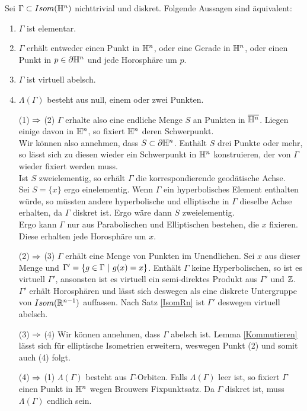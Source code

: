 \documentclass{book}
\begin{document}
\Prop{}
Sei $\Gamma \subset Isom(\mathbb{H}^n)$ nichttrivial und diskret. Folgende Aussagen sind äquivalent:
\begin{enumerate}[(1)]
	\item $\Gamma$ ist elementar.
	\item $\Gamma$ erhält entweder einen Punkt in $\mathbb{H}^n$, oder eine Gerade in $\mathbb{H}^n$, oder einen Punkt in $p \in \partial \mathbb{H}^n$ und jede Horosphäre um $p$.
	\item $\Gamma$ ist virtuell abelsch.
	\item $\Lambda(\Gamma)$ besteht aus null, einem oder zwei Punkten.
\end{enumerate}
\begin{Beweis}{}
	\begin{enumerate}
		\item[(1) $\overset{}{\Rightarrow}$ (2)] $\Gamma$ erhalte also eine endliche Menge $S$ an Punkten in $\overline{\mathbb{H}^n}$. Liegen einige davon in $\mathbb{H}^n$, so fixiert $\mathbb{H}^n$ deren Schwerpunkt.\\
		Wir können also annehmen, dass $S\subset \partial \mathbb{H}^n$. Enthält $S$ drei Punkte oder mehr, so lässt sich zu diesen wieder ein Schwerpunkt in $\mathbb{H}^n$ konstruieren, der von $\Gamma$ wieder fixiert werden muss.\\
		Ist $S$ zweielementig, so erhält $\Gamma$ die korrespondierende geodätische Achse.\\
		Sei $S = \{x\}$ ergo einelementig. Wenn $\Gamma$ ein hyperbolisches Element enthalten würde, so müssten andere hyperbolische und elliptische in $\Gamma$ dieselbe Achse erhalten, da $\Gamma$ diskret ist. Ergo wäre dann $S$ zweielementig.\\
		Ergo kann $\Gamma$ nur aus Parabolischen und Elliptischen bestehen, die $x$ fixieren. Diese erhalten jede Horosphäre um $x$.
		\item[(2) $\overset{}{\Rightarrow}$ (3)] $\Gamma$ erhält eine Menge von Punkten im Unendlichen. Sei $x$ aus dieser Menge und $\Gamma' = \set{g\in \Gamma}{g(x) = x}$. Enthält $\Gamma$ keine Hyperbolischen, so ist es  virtuell $\Gamma'$, ansonsten ist es virtuell ein semi-direktes Produkt aus $\Gamma'$ und $\mathbb{Z}$.\\
		$\Gamma'$ erhält Horosphären und lässt sich deswegen als eine diskrete Untergruppe von $Isom(\mathbb{R}^{n-1})$ auffassen. Nach Satz \ref{IsomRn} ist $\Gamma'$ deswegen virtuell abelsch.
		\item[(3) $\overset{}{\Rightarrow}$ (4)] Wir können annehmen, dass $\Gamma$ abelsch ist. Lemma \ref{Kommutieren} lässt sich für elliptische Isometrien erweitern, weswegen Punkt (2) und somit auch (4) folgt.
		\item[(4) $\overset{}{\Rightarrow}$ (1)] $\Lambda(\Gamma)$ besteht aus $\Gamma$-Orbiten. Falls $\Lambda(\Gamma)$ leer ist, so fixiert $\Gamma$ einen Punkt in $\mathbb{H}^n$ wegen Brouwers Fixpunktsatz. Da $\Gamma$ diskret ist, muss $\Lambda(\Gamma)$ endlich sein.
	\end{enumerate}
\end{Beweis}
\end{document}
